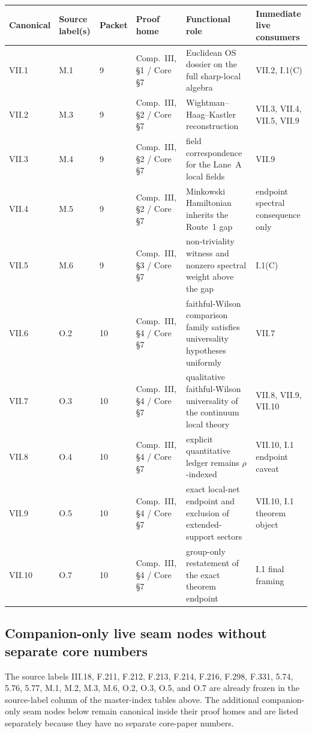 \begingroup
\scriptsize
\setlength{\tabcolsep}{3pt}
\noindent\begin{tabular}{@{}p{}p{}p{}p{}p{}p{}@{}}
\toprule
\textbf{Canonical} & \textbf{Source label(s)} & \textbf{Packet} & \textbf{Proof home} & \textbf{Functional role} & \textbf{Immediate live consumers}\\
\midrule
VII.1 & M.1 & 9 & Comp.~III, \S1 / Core \S7 & Euclidean OS dossier on the full sharp-local algebra & VII.2, I.1(C)\\[0.3em]
VII.2 & M.3 & 9 & Comp.~III, \S2 / Core \S7 & Wightman--Haag--Kastler reconstruction & VII.3, VII.4, VII.5, VII.9\\[0.3em]
VII.3 & M.4 & 9 & Comp.~III, \S2 / Core \S7 & field correspondence for the Lane~A local fields & VII.9\\[0.3em]
VII.4 & M.5 & 9 & Comp.~III, \S2 / Core \S7 & Minkowski Hamiltonian inherits the Route~1 gap & endpoint spectral consequence only\\[0.3em]
VII.5 & M.6 & 9 & Comp.~III, \S3 / Core \S7 & non-triviality witness and nonzero spectral weight above the gap & I.1(C)\\[0.3em]
VII.6 & O.2 & 10 & Comp.~III, \S4 / Core \S7 & faithful-Wilson comparison family satisfies universality hypotheses uniformly & VII.7\\[0.3em]
VII.7 & O.3 & 10 & Comp.~III, \S4 / Core \S7 & qualitative faithful-Wilson universality of the continuum local theory & VII.8, VII.9, VII.10\\[0.3em]
VII.8 & O.4 & 10 & Comp.~III, \S4 / Core \S7 & explicit quantitative ledger remains $\rho$-indexed & VII.10, I.1 endpoint caveat\\[0.3em]
VII.9 & O.5 & 10 & Comp.~III, \S4 / Core \S7 & exact local-net endpoint and exclusion of extended-support sectors & VII.10, I.1 theorem object\\[0.3em]
VII.10 & O.7 & 10 & Comp.~III, \S4 / Core \S7 & group-only restatement of the exact theorem endpoint & I.1 final framing\\
\bottomrule
\end{tabular}
\endgroup

\subsection*{Companion-only live seam nodes without separate core numbers}

The source labels III.18, F.211, F.212, F.213, F.214, F.216, F.298, F.331, 5.74, 5.76, 5.77, M.1, M.2, M.3, M.6, O.2, O.3, O.5, and O.7 are already frozen in the source-label column of the master-index tables above. The additional companion-only seam nodes below remain canonical inside their proof homes and are listed separately because they have no separate core-paper numbers.


